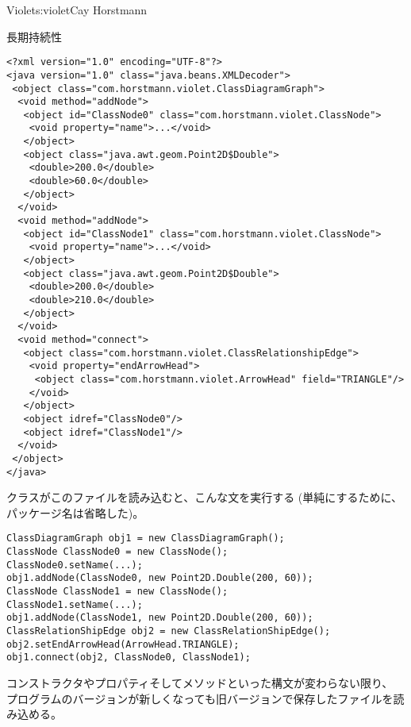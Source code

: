 \begin{aosachapter}{Violet}{s:violet}{Cay Horstmann}
\begin{aosasect1}{長期持続性}
\begin{verbatim}
<?xml version="1.0" encoding="UTF-8"?>
<java version="1.0" class="java.beans.XMLDecoder">
 <object class="com.horstmann.violet.ClassDiagramGraph"> 
  <void method="addNode"> 
   <object id="ClassNode0" class="com.horstmann.violet.ClassNode"> 
    <void property="name">...</void> 
   </object> 
   <object class="java.awt.geom.Point2D$Double"> 
    <double>200.0</double> 
    <double>60.0</double> 
   </object> 
  </void> 
  <void method="addNode"> 
   <object id="ClassNode1" class="com.horstmann.violet.ClassNode"> 
    <void property="name">...</void> 
   </object> 
   <object class="java.awt.geom.Point2D$Double"> 
    <double>200.0</double> 
    <double>210.0</double> 
   </object> 
  </void> 
  <void method="connect"> 
   <object class="com.horstmann.violet.ClassRelationshipEdge"> 
    <void property="endArrowHead"> 
     <object class="com.horstmann.violet.ArrowHead" field="TRIANGLE"/> 
    </void> 
   </object> 
   <object idref="ClassNode0"/> 
   <object idref="ClassNode1"/> 
  </void> 
 </object> 
</java>
\end{verbatim}

クラスがこのファイルを読み込むと、こんな文を実行する
(単純にするために、パッケージ名は省略した)。

\begin{verbatim}
ClassDiagramGraph obj1 = new ClassDiagramGraph();
ClassNode ClassNode0 = new ClassNode();
ClassNode0.setName(...);
obj1.addNode(ClassNode0, new Point2D.Double(200, 60));
ClassNode ClassNode1 = new ClassNode();
ClassNode1.setName(...);
obj1.addNode(ClassNode1, new Point2D.Double(200, 60));
ClassRelationShipEdge obj2 = new ClassRelationShipEdge();
obj2.setEndArrowHead(ArrowHead.TRIANGLE);
obj1.connect(obj2, ClassNode0, ClassNode1);
\end{verbatim}

コンストラクタやプロパティそしてメソッドといった構文が変わらない限り、
プログラムのバージョンが新しくなっても旧バージョンで保存したファイルを読み込める。


\end{aosasect1}
\end{aosachapter}
